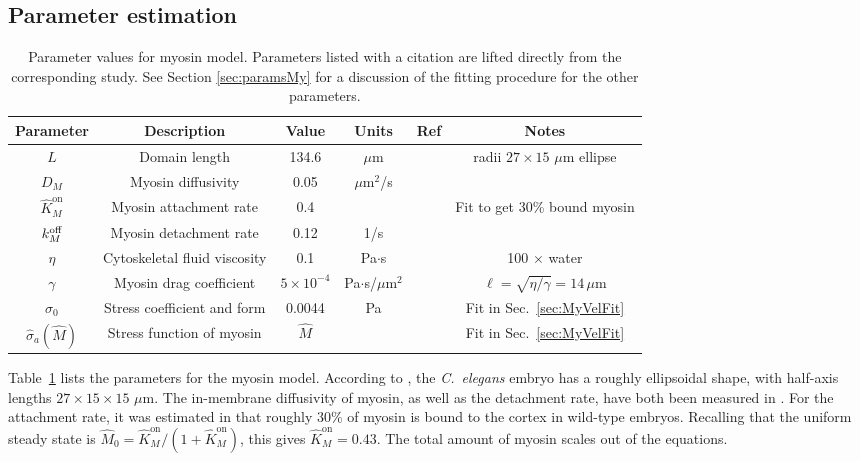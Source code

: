 \documentclass[11pt]{article}
\newcommand{\6}[1]{#1_{\text{6}}}
\newcommand{\3}[1]{#1_{\text{3}}}
\newcommand{\My}[1]{#1_M}
\begin{document}
\subsection{Parameter estimation \label{sec:paramsMy}}

\begin{table}
\begin{small}
\centering
\begin{tabular}{|c|c|c|c|c|c|}\hline
Parameter & Description & Value & Units & Ref & Notes \\ \hline
$L$ & Domain length & 134.6 & $\mu$m &  \cite{goehring2011polarization} & radii $27 \times 15$ $\mu$m ellipse\\
$\My{D}$ & Myosin diffusivity & 0.05 & $\mu$m$^2$/s & \cite{gross2019guiding} &\\
$\hat{K}^\text{on}_M$ & Myosin attachment rate & 0.4 & & & Fit to get 30\% bound myosin\\
$\My{\koff} $ & Myosin detachment rate & 0.12 & 1/s & \cite{gross2019guiding}& \\
$\eta$ & Cytoskeletal fluid viscosity & 0.1 & Pa$\cdot$s & &100 $\times$ water \\
$\gamma$ & Myosin drag coefficient & $5 \times 10^{-4}$ & Pa$\cdot$s/$\mu$m$^2$ &  & $\ell=\sqrt{\eta/\gamma}=14 \, \mu$m \cite{mayer2010anisotropies}\\ 
$\sigma_0$ & Stress coefficient and form& 0.0044 & Pa & & Fit in Sec.\ \ref{sec:MyVelFit}\\
$\hat \sigma_a(\hat M)$ & Stress function of myosin& $\hat M$ & & & Fit in Sec.\ \ref{sec:MyVelFit}\\ \hline
\end{tabular}
\caption{\label{tab:paramsMy} Parameter values for myosin model. Parameters listed with a citation are lifted directly from the corresponding study. See Section \ref{sec:paramsMy} for a discussion of the fitting procedure for the other parameters. }
\end{small}
\end{table}

Table\ \ref{tab:paramsMy} lists the parameters for the myosin model. According to \cite{goehring2011polarization}, the \emph{C.\ elegans} embryo has a roughly ellipsoidal shape, with half-axis lengths $27 \times 15 \times 15$ $\mu$m.  The in-membrane diffusivity of myosin, as well as the detachment rate, have both been measured in \cite{gross2019guiding}. For the attachment rate, it was estimated in \cite[Fig.~S3m]{gross2019guiding} that roughly 30\% of myosin is bound to the cortex in wild-type embryos. Recalling that the uniform steady state is $\hat M_0=\hat{K}^\text{on}_M/\left(1+\hat{K}^\text{on}_M\right)$, this gives $\hat{K}^\text{on}_M=0.43$. The total amount of myosin scales out of the equations.
\end{document}
